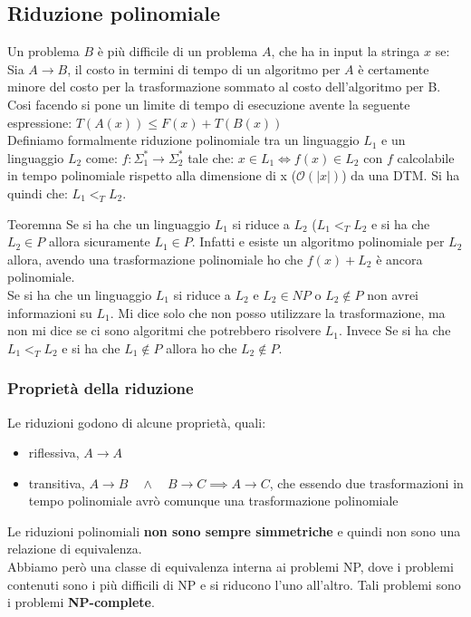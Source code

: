 \subsection{Riduzione polinomiale}

Un problema $B$ è più difficile di un problema $A$, che ha in input la stringa  $x$ se: \\
Sia $A\to B$, il costo in termini di tempo di un algoritmo per $A$ è certamente minore del costo per la trasformazione sommato al costo dell'algoritmo per B.  Cosi facendo si pone un limite di tempo di esecuzione avente la seguente espressione: $T(A(x))\leq F(x)+T(B(x))$\\

Definiamo formalmente riduzione polinomiale tra un linguaggio $L_1$ e un linguaggio $L_2$ come:  $\displaystyle f:\Sigma_1^*\to \Sigma_2^*$ tale che: $x\in L_1\iff f(x)\in L_2$ con $f$ calcolabile in tempo polinomiale rispetto alla dimensione di x ($\mathcal{O}(|x|)$) da una DTM. Si ha quindi che: $L_1<_T L_2$.

\begin{teorema}{Teoremna}{}
  Se si ha che un linguaggio $L_1$ si riduce a $L_2$ ($L_1<_T L_2$ e si ha che $L_2 \in P$ allora sicuramente $L_1\in P$. Infatti e esiste un algoritmo polinomiale per $L_2$ allora, avendo una trasformazione polinomiale ho che $f(x)+L_2$ è ancora polinomiale.\\
  
  Se si ha che un linguaggio $L_1$ si riduce a $L_2$ e $L_2 \in NP$ o $L_2 \notin P$ non avrei informazioni su $L_1$. Mi dice solo che non posso utilizzare la trasformazione, ma non mi dice se ci sono algoritmi che potrebbero risolvere $L_1$. Invece Se si ha che $L_1<_T L_2$ e si ha che $L_1\notin P$ allora ho che $L_2\notin P$.
\end{teorema} 
\subsubsection{Proprietà della riduzione}
Le riduzioni godono di alcune proprietà, quali:
\begin{itemize}
  \item riflessiva, $A\to A$
  \item transitiva, $A\to B \quad \land \quad B\to C \implies A\to C$, che essendo due trasformazioni in tempo polinomiale avrò comunque una trasformazione
  polinomiale 
 \end{itemize}
Le riduzioni polinomiali \textbf{non sono sempre simmetriche} e quindi non sono una relazione di equivalenza.\\
Abbiamo però una classe di equivalenza interna ai problemi NP, dove i problemi contenuti sono i più difficili di NP e si riducono l'uno all'altro. Tali problemi sono i problemi \textbf{NP-complete}.

